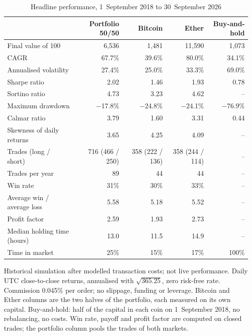 \documentclass[11pt,a4paper]{article}
\newcommand{\1}{\mathbf{1}}
\begin{document}
\begin{table}[tbp]
\centering\small\setlength{\tabcolsep}{5pt}
\begin{threeparttable}
\caption{Headline performance, 1~September 2018 to 30~September 2026}\label{tab:headline}
\begin{tabular}{lrrrr}
\toprule
 & Portfolio 50/50 & Bitcoin & Ether & Buy-and-hold \\
\midrule
Final value of 100 & 6{,}536 & 1{,}481 & 11{,}590 & 1{,}073 \\
CAGR & 67.7\% & 39.6\% & 80.0\% & 34.1\% \\
Annualised volatility & 27.4\% & 25.0\% & 33.3\% & 69.0\% \\
Sharpe ratio & 2.02 & 1.46 & 1.93 & 0.78 \\
Sortino ratio & 4.73 & 3.23 & 4.62 & -- \\
Maximum drawdown & \ensuremath{-}17.8\% & \ensuremath{-}24.8\% & \ensuremath{-}24.1\% & \ensuremath{-}76.9\% \\
Calmar ratio & 3.79 & 1.60 & 3.31 & 0.44 \\
Skewness of daily returns & 3.65 & 4.25 & 4.09 & -- \\
\midrule
Trades (long / short) & 716 (466 / 250) & 358 (222 / 136) & 358 (244 / 114) & -- \\
Trades per year & 89 & 44 & 44 & -- \\
Win rate & 31\% & 30\% & 33\% & -- \\
Average win / average loss & 5.58 & 5.18 & 5.52 & -- \\
Profit factor & 2.59 & 1.93 & 2.73 & -- \\
Median holding time (hours) & 13.0 & 11.5 & 14.9 & -- \\
Time in market & 25\% & 15\% & 17\% & 100\% \\
\bottomrule
\end{tabular}
\begin{tablenotes}[flushleft]\footnotesize
\item Historical simulation after modelled transaction costs; not live performance. Daily UTC close-to-close returns, annualised with $\sqrt{365.25}$, zero risk-free rate. Commission 0.045\% per order; no slippage, funding or leverage. Bitcoin and Ether columns are the two halves of the portfolio, each measured on its own capital. Buy-and-hold: half of the capital in each coin on 1~September 2018, no rebalancing, no costs. Win rate, payoff and profit factor are computed on closed trades; the portfolio column pools the trades of both markets.
\end{tablenotes}
\end{threeparttable}
\end{table}
\end{document}
